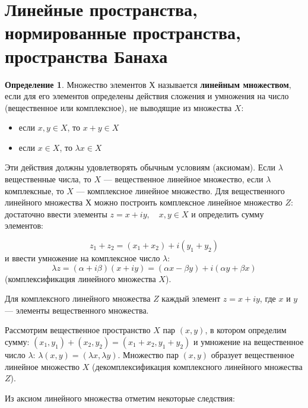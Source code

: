 \documentclass[12pt,a4paper,titlepage,oneside]{book}
\theoremstyle{definition}
\newtheorem*{definition}{Определение}
\theoremstyle{plain}
\theoremstyle{remark}
\theoremstyle{remark}
\theoremstyle{remark}
\theoremstyle{remark}
\theoremstyle{plain}
\theoremstyle{plain}
\begin{document}
\section{Линейные пространства, нормированные пространства, пространства Банаха}

\begin{definition}

Множество элементов $Х$ называется \textbf{линейным множеством}, если для его элементов определены действия сложения и умножения на число (вещественное или комплексное), не выводящие из множества $X$:

\begin{itemize}

	\item если $x,y\in X$, то $x+y\in X$

	\item если $x\in X$, то $\lambda x\in X$

\end{itemize}

\end{definition}


Эти действия должны удовлетворять обычным условиям (аксиомам). Если $\lambda$ вещественные числа, то $X$ --- вещественное линейное множество, если $\lambda$ комплексные, то $X$ --- комплексное линейное множество. Для вещественного линейного множества $Х$ можно построить комплексное линейное множество $Z$: достаточно ввести элементы $z=x+iy,\quad x,y \in X$ и определить сумму элементов:

\begin{equation*}
z_1+z_2=(x_1+x_2)+i(y_1+y_2)
\end{equation*}
и ввести умножение на комплексное число $\lambda$:
\begin{equation*}
\lambda z = (\alpha + i\beta)(x+iy) = (\alpha x - \beta y)+i(\alpha y + \beta x)
\end{equation*}
(комплексификация линейного множества $X$).

Для комплексного линейного множества $Z$ каждый элемент $z=x+iy$, где $x$ и $y$ --- элементы вещественного множества.

Рассмотрим вещественное пространство $X$ пар $(x,y)$, в котором определим сумму: $(x_1,y_1)+(x_2,y_2) = (x_1+x_2,y_1+y_2)$ и умножение на вещественное число $\lambda$: $\lambda(x,y) = (\lambda x, \lambda y)$. Множество пар $(x,y)$ образует вещественное линейное множество  $X$ (декомплексификация комплексного линейного множества $Z$).

Из аксиом линейного множества отметим некоторые следствия:
\end{document}
